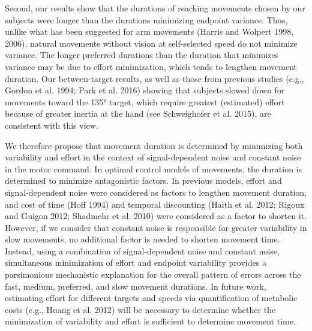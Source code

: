 Second, our results show that the durations of reaching movements chosen by our subjects were longer than the durations minimizing endpoint variance. Thus, unlike what has been suggested for arm movements (Harris and Wolpert 1998, 2006), natural movements without vision at self-selected speed do not minimize variance. The longer preferred durations than the duration that minimizes variance may be due to effort minimization, which tends to lengthen movement duration. Our between-target results, as well as those from previous studies (e.g., Gordon et al. 1994; Park et al. 2016) showing that subjects slowed down for movements toward the 135° target, which require greatest (estimated) effort because of greater inertia at the hand (see Schweighofer et al. 2015), are consistent with this view.

We therefore propose that movement duration is determined by minimizing both variability and effort in the context of signal-dependent noise and constant noise in the motor command. In optimal control models of movements, the duration is determined to minimize antagonistic factors. In previous models, effort and signal-dependent noise were considered as factors to lengthen movement duration, and cost of time (Hoff 1994) and temporal discounting (Haith et al. 2012; Rigoux and Guigon 2012; Shadmehr et al. 2010) were considered as a factor to shorten it. However, if we consider that constant noise is responsible for greater variability in slow movements, no additional factor is needed to shorten movement time. Instead, using a combination of signal-dependent noise and constant noise, simultaneous minimization of effort and endpoint variability provides a parsimonious mechanistic explanation for the overall pattern of errors across the fast, medium, preferred, and slow movement durations. In future work, estimating effort for different targets and speeds via quantification of metabolic costs (e.g., Huang et al. 2012) will be necessary to determine whether the minimization of variability and effort is sufficient to determine movement time.

